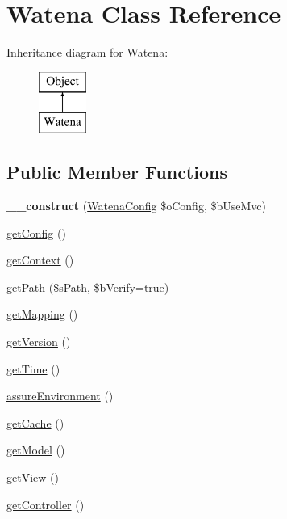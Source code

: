 \hypertarget{class_watena}{\section{Watena Class Reference}
\label{class_watena}
}
Inheritance diagram for Watena\-:\begin{figure}[H]
\begin{center}
\leavevmode
\includegraphics[height=2.000000cm]{class_watena}
\end{center}
\end{figure}
\subsection*{Public Member Functions}
\begin{DoxyCompactItemize}
\item 
\hypertarget{class_watena_a67a9c6f423e2ee39991db13ebb082bad}{{\bfseries \-\_\-\-\_\-construct} (\hyperlink{class_watena_config}{Watena\-Config} \$o\-Config, \$b\-Use\-Mvc)}\label{class_watena_a67a9c6f423e2ee39991db13ebb082bad}

\item 
\hyperlink{class_watena_ae2a5396767761144dbd71c98dac9ee3a}{get\-Config} ()
\item 
\hyperlink{class_watena_a4914a1f841aa359d3a96d7ba5dcbeb22}{get\-Context} ()
\item 
\hyperlink{class_watena_a86b473f1d00375489d2acb3b68bd9d87}{get\-Path} (\$s\-Path, \$b\-Verify=true)
\item 
\hyperlink{class_watena_a874a0c4c3128fffb207b3f0dd2b9b844}{get\-Mapping} ()
\item 
\hyperlink{class_watena_a87fe5ba5f785aae289e6b9d596d76edf}{get\-Version} ()
\item 
\hyperlink{class_watena_a1d26390dfa4cf277e100f080281f922e}{get\-Time} ()
\item 
\hyperlink{class_watena_a0ca805266f0d79ffaeeddbcbe1706047}{assure\-Environment} ()
\item 
\hyperlink{class_watena_af176ea43247da68a79d476a5c9d3f734}{get\-Cache} ()
\item 
\hyperlink{class_watena_ae841100e5804adb18ef1c01cf3692560}{get\-Model} ()
\item 
\hyperlink{class_watena_a8eab688628ea219d711f235151627d34}{get\-View} ()
\item 
\hyperlink{class_watena_a47a40ca2e913819842ef4e82a7142609}{get\-Controller} ()
\end{DoxyCompactItemize}
